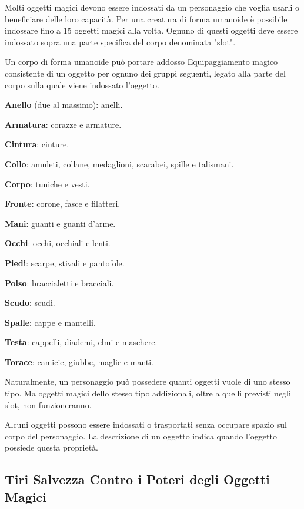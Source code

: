 \documentclass[a4paper,11pt,twoside,openany]{book}
\begin{document}
\label{oggetti-magici-sul-corpo}

Molti oggetti magici devono essere indossati da un personaggio che voglia usarli o beneficiare delle loro capacità. Per una creatura di forma umanoide è possibile indossare fino a 15 oggetti magici alla volta. Ognuno di questi oggetti deve essere indossato sopra una parte specifica del corpo denominata "slot".

Un corpo di forma umanoide può portare addosso Equipaggiamento magico consistente di un oggetto per ognuno dei gruppi seguenti, legato alla parte del corpo sulla quale viene indossato l'oggetto.

\textbf{Anello} (due al massimo): anelli.

\textbf{Armatura}: corazze e armature.

\textbf{Cintura}: cinture.

\textbf{Collo}: amuleti, collane, medaglioni, scarabei, spille e talismani.

\textbf{Corpo}: tuniche e vesti.

\textbf{Fronte}: corone, fasce e filatteri.

\textbf{Mani}: guanti e guanti d'arme.

\textbf{Occhi}: occhi, occhiali e lenti.

\textbf{Piedi}: scarpe, stivali e pantofole.

\textbf{Polso}: braccialetti e bracciali.

\textbf{Scudo}: scudi.

\textbf{Spalle}: cappe e mantelli.

\textbf{Testa}: cappelli, diademi, elmi e maschere.

\textbf{Torace}: camicie, giubbe, maglie e manti.

Naturalmente, un personaggio può possedere quanti oggetti vuole di uno stesso tipo. Ma oggetti magici dello stesso tipo addizionali, oltre a quelli previsti negli slot, non funzioneranno.

Alcuni oggetti possono essere indossati o trasportati senza occupare spazio sul corpo del personaggio. La descrizione di un oggetto indica quando l'oggetto possiede questa proprietà.


\subsection{Tiri Salvezza Contro i Poteri degli Oggetti Magici}

\label{tiri-salvezza-contro-i-poteri-degli-oggetti-magici}
\end{document}
